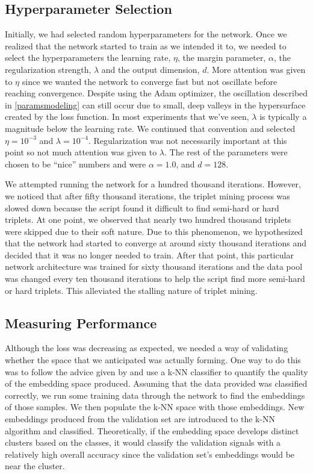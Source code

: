 \subsection{Hyperparameter Selection}

Initially, we had selected random hyperparameters for the network. Once we realized that the network started to train as we intended it to, we needed to select the hyperparameters the learning rate, $\eta$, the margin parameter, $\alpha$, the regularization strength, $\lambda$ and the output dimension, $d$. More attention was given to $\eta$ since we wanted the network to converge fast but not oscillate before reaching convergence. Despite using the Adam optimizer, the oscillation described in \cref{paramsmodeling} can still occur due to small, deep valleys in the hypersurface created by the loss function. In most experiments that we've seen, $\lambda$ is typically a magnitude below the learning rate. We continued that convention and selected $\eta = 10^{-3}$ and $\lambda=10^{-4}$. Regularization was not necessarily important at this point so not much attention was given to $\lambda$.  The rest of the parameters were chosen to be ``nice'' numbers and were $\alpha = 1.0$, and $d=128$.  

We attempted running the network for a hundred thousand iterations. However, we noticed that after fifty thousand iterations, the triplet mining process was slowed down because the script found it difficult to find semi-hard or hard triplets. At one point, we observed that nearly two hundred thousand triplets were skipped due to their soft nature. Due to this phenomenon, we hypothesized that the network had started to converge at around sixty thousand iterations and decided that it was no longer needed to train. After that point, this particular network architecture was trained for sixty thousand iterations and the data pool was changed every ten thousand iterations to help the script find more semi-hard or hard triplets. This alleviated the stalling nature of triplet mining. 

\subsection{Measuring Performance}

Although the loss was decreasing as expected, we needed a way of validating whether the space that we anticipated was actually forming. One way to do this was to follow the advice given by \citet{facenet} and use a k-NN classifier to quantify the quality of the embedding space produced. Assuming that the data provided was classified correctly, we run some training data through the network to find the embeddings of those samples. We then populate the k-NN space with those embeddings. New embeddings produced from the validation set are introduced to the k-NN algorithm and classified. Theoretically, if the embedding space develops distinct clusters based on the classes, it would classify the validation signals with a relatively high overall accuracy since the validation set's embeddings would be near the cluster.  


